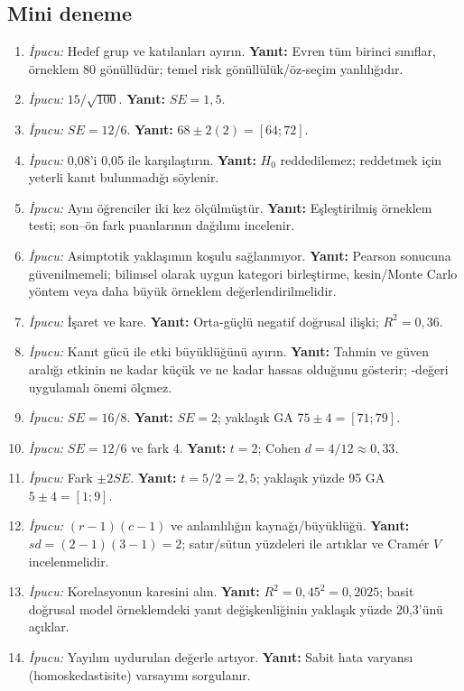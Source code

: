 \subsection*{Mini deneme}

\begin{enumerate}[leftmargin=*,itemsep=5pt]
\item \emph{İpucu:} Hedef grup ve katılanları ayırın.
\textbf{Yanıt:} Evren tüm birinci sınıflar, örneklem 80 gönüllüdür; temel risk
gönüllülük/öz-seçim yanlılığıdır.
\item \emph{İpucu:} $15/\sqrt{100}$.
\textbf{Yanıt:} $SE=1{,}5$.
\item \emph{İpucu:} $SE=12/6$.
\textbf{Yanıt:} $68\pm2(2)=[64;72]$.
\item \emph{İpucu:} 0,08'i 0,05 ile karşılaştırın.
\textbf{Yanıt:} $H_0$ reddedilemez; reddetmek için yeterli kanıt bulunmadığı söylenir.
\item \emph{İpucu:} Aynı öğrenciler iki kez ölçülmüştür.
\textbf{Yanıt:} Eşleştirilmiş örneklem testi; son--ön fark puanlarının dağılımı incelenir.
\item \emph{İpucu:} Asimptotik yaklaşımın koşulu sağlanmıyor.
\textbf{Yanıt:} Pearson sonucuna güvenilmemeli; bilimsel olarak uygun kategori
birleştirme, kesin/Monte Carlo yöntem veya daha büyük örneklem değerlendirilmelidir.
\item \emph{İpucu:} İşaret ve kare.
\textbf{Yanıt:} Orta-güçlü negatif doğrusal ilişki; $R^2=0{,}36$.
\item \emph{İpucu:} Kanıt gücü ile etki büyüklüğünü ayırın.
\textbf{Yanıt:} Tahmin ve güven aralığı etkinin ne kadar küçük ve ne kadar
hassas olduğunu gösterir; \pval-değeri uygulamalı önemi ölçmez.
\item \emph{İpucu:} $SE=16/8$.
\textbf{Yanıt:} $SE=2$; yaklaşık GA $75\pm4=[71;79]$.
\item \emph{İpucu:} $SE=12/6$ ve fark 4.
\textbf{Yanıt:} $t=2$; Cohen $d=4/12\approx0{,}33$.
\item \emph{İpucu:} Fark $\pm2SE$.
\textbf{Yanıt:} $t=5/2=2{,}5$; yaklaşık yüzde 95 GA $5\pm4=[1;9]$.
\item \emph{İpucu:} $(r-1)(c-1)$ ve anlamlılığın kaynağı/büyüklüğü.
\textbf{Yanıt:} $sd=(2-1)(3-1)=2$; satır/sütun yüzdeleri ile artıklar ve
Cramér $V$ incelenmelidir.
\item \emph{İpucu:} Korelasyonun karesini alın.
\textbf{Yanıt:} $R^2=0{,}45^2=0{,}2025$; basit doğrusal model örneklemdeki
yanıt değişkenliğinin yaklaşık yüzde 20,3'ünü açıklar.
\item \emph{İpucu:} Yayılım uydurulan değerle artıyor.
\textbf{Yanıt:} Sabit hata varyansı (homoskedastisite) varsayımı sorgulanır.
\end{enumerate}

